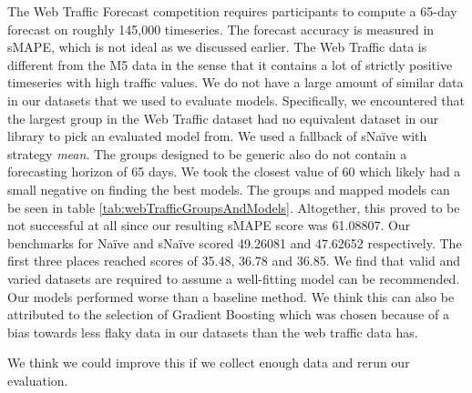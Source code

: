 The Web Traffic Forecast competition requires participants to compute a 65-day forecast on roughly 145,000 timeseries. The forecast accuracy is measured in sMAPE, which is not ideal as we discussed earlier. The Web Traffic data is different from the M5 data in the sense that it contains a lot of strictly positive timeseries with high traffic values. We do not have a large amount of similar data in our datasets that we used to evaluate models. Specifically, we encountered that the largest group in the Web Traffic dataset had no equivalent dataset in our library to pick an evaluated model from. We used a fallback of sNa\"ive with strategy \emph{mean}. The groups designed to be generic also do not contain a forecasting horizon of 65 days. We took the closest value of 60 which likely had a small negative on finding the best models. The groups and mapped models can be seen in table \ref{tab:webTrafficGroupsAndModels}. Altogether, this proved to be not successful at all since our resulting sMAPE score was 61.08807. Our benchmarks for Na\"ive and sNa\"ive scored 49.26081 and 47.62652 respectively. The first three places reached scores of 35.48, 36.78 and 36.85. We find that valid and varied datasets are required to assume a well-fitting model can be recommended. Our models performed worse than a baseline method. We think this can also be attributed to the selection of Gradient Boosting which was chosen because of a bias towards less flaky data in our datasets than the web traffic data has.

We think we could improve this if we collect enough data and rerun our evaluation.

